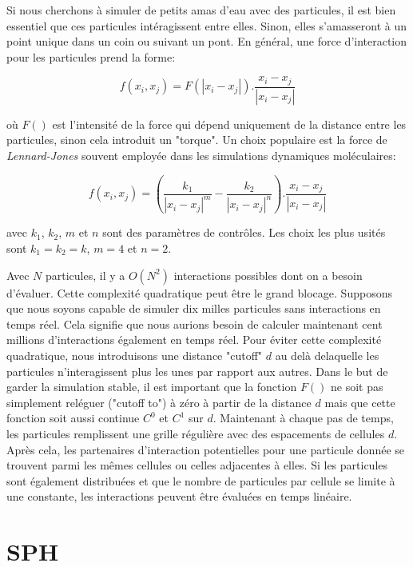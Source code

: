\documentclass[11pt]{report}
\begin{document}
Si nous cherchons à simuler de petits amas d'eau avec des particules, il est bien essentiel que ces particules intéragissent entre elles. Sinon, elles s'amasseront à un point unique dans un coin ou suivant un pont. En général, une force d'interaction pour les particules prend la forme:

\begin{equation}
f(x_i, x_j) = F(|x_i - x_j|) . \frac{x_i - x_j}{|x_i - x_j|}
\end{equation}

où $F()$ est l'intensité de la force qui dépend uniquement de la distance entre les particules, sinon cela introduit un "torque". Un choix populaire est la force de \textit{Lennard-Jones} souvent employée dans les simulations dynamiques moléculaires:

\begin{equation}
f(x_i, x_j) = \left(\frac{k_1}{|x_i - x_j|^m} - \frac{k_2}{|x_i - x_j|^n} \right)  . \frac{x_i - x_j}{|x_i - x_j|}
\end{equation}

avec $k_1$, $k_2$, $m$ et $n$ sont des paramètres de contrôles. Les choix les plus usités sont $k_1 = k_2 = k$, $m = 4$ et $n = 2$.

Avec $N$ particules, il y a $O(N^2)$ interactions possibles dont on a besoin d'évaluer. Cette complexité quadratique peut être le grand blocage. Supposons que nous soyons capable de simuler dix milles particules sans interactions en temps réel. Cela signifie que nous aurions besoin de calculer maintenant cent millions d'interactions également en temps réel. Pour éviter cette complexité quadratique, nous introduisons une distance "cutoff"  $d$ au delà delaquelle les particules n'interagissent plus les unes par rapport aux autres. Dans le but de garder la simulation stable, il est important que la fonction $F()$ ne soit pas simplement reléguer ("cutoff to") à zéro à partir de la distance $d$ mais que cette fonction soit aussi continue $C^0$ et $C^1$ sur $d$. Maintenant à chaque pas de temps, les particules remplissent une grille régulière avec des espacements de cellules $d$. Après cela, les partenaires d'interaction potentielles pour une particule donnée se trouvent parmi les mêmes cellules ou celles adjacentes à elles. Si les particules sont également distribuées et que le nombre de particules par cellule se limite à une constante, les interactions peuvent être évaluées en temps linéaire.

\section{SPH}
\end{document}
